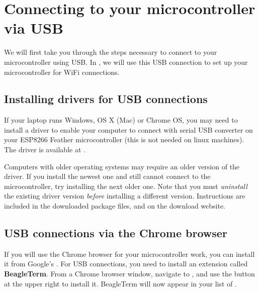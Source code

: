 \section{Connecting to your microcontroller via USB}
We will first take you through the steps necessary to connect to your microcontroller using USB. In , we will use this USB connection to set up your microcontroller for WiFi connections.

\subsection{Installing drivers for USB connections}
If your laptop runs Windows, OS X (Mac) or Chrome OS, you may need to install a driver to enable your computer to connect with serial USB converter on your ESP8266 Feather microcontroller (this is not needed on linux machines).
The driver is available at .

Computers with older operating systems may require an older version of the driver.
If you install the newest one and still cannot connect to the microcontroller, try installing the next older one.
Note that you must \emph{uninstall} the existing driver version \emph{before} installing a different version.
Instructions are included in the downloaded package files, and on the download website.

\subsection{USB connections via the Chrome browser}
If you will use the Chrome browser for your microcontroller work, you can install it from Google's .
For USB connections, you need to install an extension called \textbf{BeagleTerm}.
From a Chrome browser window, navigate to  , and use the button at the upper right to install it.
BeagleTerm will now appear in your list of .


